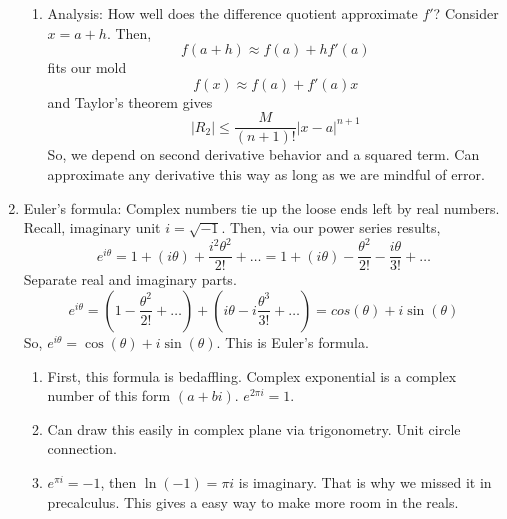 \documentclass{article}
\newcommand{\ds}{\displaystyle}
\begin{document}
\begin{enumerate}
\begin{enumerate}
\item Analysis: How well does the difference quotient approximate $f'$? Consider $x = a+h$. Then,
\[
f(a+h) \approx f(a) + hf'(a)
\]
fits our mold
\[
f(x) \approx f(a) + f'(a) x 
\]
and Taylor's theorem gives
\[
|R_2| \leq \frac{M}{(n+1)!} |x-a|^{n+1}
\]
So, we depend on second derivative behavior and a squared term. Can approximate any derivative this way as long as we are mindful of error.
\end{enumerate}

\item Euler's formula: Complex numbers tie up the loose ends left by real numbers. Recall, imaginary unit $i=\sqrt{-1}$. Then, via our power series results,
\[
e^{i\theta} = 1 + (i\theta) + \frac{i^2\theta^2}{2!} + \dots
= 1 + (i\theta) - \frac{\theta^2}{2!} - \frac{i\theta}{3!} + \dots
\]
Separate real and imaginary parts.
\[
e^{i\theta} = \left( 1 - \frac{\theta^2}{2!}+\dots \right) + \left( i\theta - i\frac{\theta^3}{3!}+\dots \right) = cos(\theta)+i\sin(\theta)
\]
So, $\ds e^{i\theta} = \cos(\theta) + i\sin(\theta)$. This is Euler's formula.
\begin{enumerate}
\item First, this formula is bedaffling. Complex exponential is a complex number of this form $(a+bi)$. $e^{2\pi i}=1$.
\item Can draw this easily in complex plane via trigonometry. Unit circle connection. 
\item $e^{\pi i}=-1$, then $\ln(-1) = \pi i$ is imaginary. That is why we missed it in precalculus. This gives a easy way to make more room in the reals.
\end{enumerate}


\end{enumerate}
\end{document}
